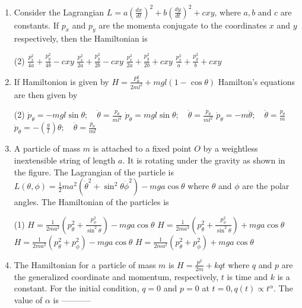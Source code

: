 \begin{enumerate}
	\item Consider the Lagrangian $L=a\left(\frac{d x}{d t}\right)^{2}+b\left(\frac{d y}{d t}\right)^{2}+c x y$, where $a, b$ and $c$ are constants. If $p_{x}$ and $p_{y}$ are the momenta conjugate to the coordinates $x$ and $y$ respectively, then the Hamiltonian is
	{}
	 \begin{tasks}(2)
		\task[\textbf{a.}]$\frac{p_{x}^{2}}{4 a}+\frac{p_{y}^{2}}{4 b}-c x y$
		\task[\textbf{b.}]$\frac{p_{x}^{2}}{2 a}+\frac{p_{y}^{2}}{2 b}-c x y$
		\task[\textbf{c.}]$\frac{p_{x}^{2}}{2 a}+\frac{p_{y}^{2}}{2 b}+c x y$
		\task[\textbf{d.}] $\frac{p_{x}^{2}}{a}+\frac{p_{y}^{2}}{b}+c x y$
	\end{tasks}
	\item  If Hamiltonion is given by $H=\frac{P_{\theta}^{2}}{2 m l^{2}}+m g l(1-\cos \theta)$ Hamilton's equations are then given by
	{}
	 \begin{tasks}(2)
		\task[\textbf{a.}] $\dot{p}_{\theta}=-m g l \sin \theta ; \quad \dot{\theta}=\frac{p_{\theta}}{m l^{2}}$
		\task[\textbf{b.}]$\dot{p}_{\theta}=m g l \sin \theta ; \quad \dot{\theta}=\frac{p_{\theta}}{m l^{2}}$
		\task[\textbf{c.}]$\dot{p}_{\theta}=-m \ddot{\theta} ; \quad \dot{\theta}=\frac{p_{\theta}}{m}$
		\task[\textbf{d.}] $\dot{p}_{\theta}=-\left(\frac{g}{l}\right) \theta ; \quad \dot{\theta}=\frac{p_{\theta}}{m l}$
	\end{tasks}
	\item  A particle of mass $m$ is attached to a fixed point $O$ by a weightless inextensible string of length $a$. It is rotating under the gravity as shown in the figure. The Lagrangian of the particle is
	$L(\theta, \phi)=\frac{1}{2} m a^{2}\left(\dot{\theta}^{2}+\sin ^{2} \theta \dot{\phi}^{2}\right)-m g a \cos \theta$ where $\theta$ and $\phi$ are the polar angles. The Hamiltonian of the particles is
	{}
	 \begin{tasks}(1)
		\task[\textbf{a.}]$H=\frac{1}{2 m a^{2}}\left(p_{\theta}^{2}+\frac{p_{\phi}^{2}}{\sin ^{2} \theta}\right)-m g a \cos \theta$
		\task[\textbf{b.}]$H=\frac{1}{2 m a^{2}}\left(p_{\theta}^{2}+\frac{p_{\phi}^{2}}{\sin ^{2} \theta}\right)+m g a \cos \theta$
		\task[\textbf{c.}]$H=\frac{1}{2 m a^{2}}\left(p_{\theta}^{2}+p_{\phi}^{2}\right)-m g a \cos \theta$
		\task[\textbf{d.}] $H=\frac{1}{2 m a^{2}}\left(p_{\theta}^{2}+p_{\phi}^{2}\right)+m g a \cos \theta$
	\end{tasks}
	\item  The Hamiltonian for a particle of mass $m$ is $H=\frac{p^{2}}{2 m}+k q t$ where $q$ and $p$ are the generalized coordinate and momentum, respectively, $t$ is time and $k$ is a constant. For the initial condition, $q=0$ and $p=0$ at $t=0, q(t) \propto t^{\alpha}$. The value of $\alpha$ is -----------

\end{enumerate}
